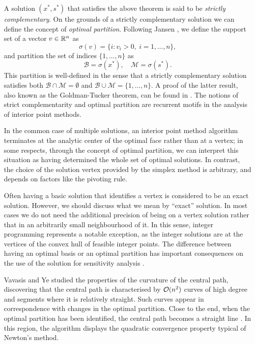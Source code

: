 A solution $(x^*,s^*)$ that satisfies the above theorem is said to be
{\em strictly complementary}. 
On the grounds of a strictly complementary
solution we can define the concept of {\em optimal partition}.
Following Jansen \cite{phd:Jansen}, we define the support set
of a vector $v \in \mathbb{R}^n$ as
\[
   \sigma(v) = \{ i : v_i > 0, \; i=1,\ldots,n \},
\]
and partition the set of indices $\{1,\ldots,n \}$ as
\[
   \mathcal{B} = \sigma(x^*), \quad \mathcal{M} = \sigma(s^*).
\]
This partition is well-defined in the sense that a 
strictly complementary solution satisfies both 
$\mathcal{B} \cap \mathcal{M} = \emptyset$ and 
$\mathcal{B} \cup \mathcal{M} = \{1,\ldots,n \}$. 
A proof of the latter result, also known as the Goldman-Tucker theorem, 
can be found in \cite{ipm:Wright97}.
The notions of strict complementarity and optimal partition are
recurrent motifs in the analysis of interior point methods.

In the common case of multiple solutions, an interior point method
algorithm terminates
at the analytic center of the optimal face rather than at a vertex; 
in some respects, through the concept of optimal partition, we can interpret
this situation as having determined the whole set of optimal solutions.
In contrast, the choice of the solution vertex provided by the simplex
method is arbitrary, and depends on factors like the pivoting rule.

Often having a basic solution that identifies a vertex is considered
to be an exact solution.
However, we should discuss what we mean by ``exact'' solution. In most
cases we do not need the additional precision of being on a vertex 
solution rather that in an arbitrarily small neighbourhood of it.
In this sense, integer programming represents a notable exception,
as the integer solutions are at the vertices of the
convex hull of feasible integer points.
The difference between having an optimal basis or an optimal partition
has important consequences on the use of the solution
for sensitivity analysis \cite{phd:Jansen,YildirimTodd01}.

Vavasis and Ye \cite{VavasisYe} studied the properties of the 
curvature of the central path, discovering that the central path
is characterised by $\mathcal{O}(n^2)$ curves of high degree and
segments where it is relatively straight.
Such curves appear in correspondence with changes in the optimal
partition.
Close to the end, when the optimal partition has been identified,
the central path becomes a straight line \cite{Megiddo}.
In this region, the algorithm displays the quadratic convergence 
property typical of Newton's method.

